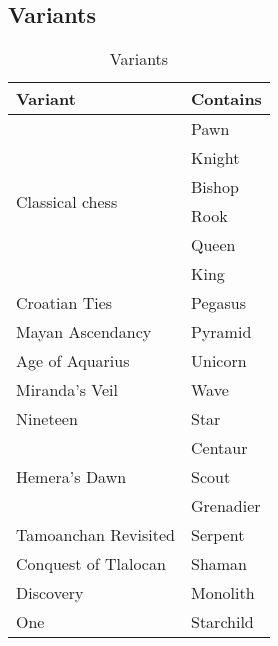 \clearpage %

\subsection*{Variants}
\label{sec:Appendix/Introduction/Variants}

\begin{table}[!h]
\centering
\begin{tabular}{ ll }
\toprule %
\textbf{Variant} & \textbf{Contains}           \\
\midrule %
\multirow{6}{*}{Classical chess} & Pawn        \\
                                 & Knight      \\
                                 & Bishop      \\
                                 & Rook        \\
                                 & Queen       \\
                                 & King        \\
\cmidrule{1-2} %
Croatian Ties                    & Pegasus     \\
Mayan Ascendancy                 & Pyramid     \\
Age of Aquarius                  & Unicorn     \\
Miranda's Veil                   & Wave        \\
Nineteen                         & Star        \\
\cmidrule{1-2} %
\multirow{3}{*}{Hemera's Dawn}   & Centaur     \\
                                 & Scout       \\
                                 & Grenadier   \\
\cmidrule{1-2} %
Tamoanchan Revisited             & Serpent     \\
Conquest of Tlalocan             & Shaman      \\
Discovery                        & Monolith    \\
One                              & Starchild   \\
\bottomrule %
\end{tabular}
\caption{Variants}
\label{tbl:Appendix/Introduction/Variants}
\end{table}

